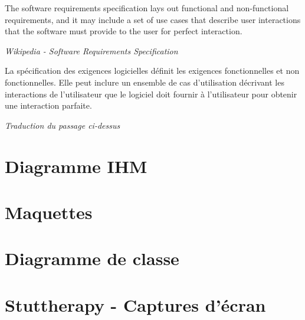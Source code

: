 \begin{appendices}
\begin{displayquote}
The software requirements specification lays out functional and non-functional requirements, and it may include a set of use cases that describe user interactions that the software must provide to the user for perfect interaction.
\end{displayquote}
\hspace*{\fill} \textit{Wikipedia - Software Requirements Specification}


\begin{displayquote}
La spécification des exigences logicielles définit les exigences fonctionnelles et non fonctionnelles. Elle peut inclure un ensemble de cas d'utilisation décrivant les interactions de l'utilisateur que le logiciel doit fournir à l'utilisateur pour obtenir une interaction parfaite.
\end{displayquote}
\hspace*{\fill} \textit{Traduction du passage ci-dessus}


\chapter{Diagramme IHM}

\chapter{Maquettes}

\chapter{Diagramme de classe}

\chapter{Stuttherapy - Captures d'écran}


\end{appendices}

